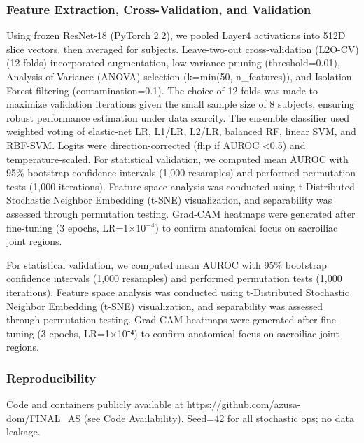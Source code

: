 \documentclass[12pt, a4paper]{article}
\begin{document}
\subsubsection{Feature Extraction, Cross-Validation, and Validation}
Using frozen ResNet-18 (PyTorch 2.2), we pooled Layer4 activations into 512D slice vectors, then averaged for subjects. Leave-two-out cross-validation (L2O-CV) (12 folds) incorporated augmentation, low-variance pruning (threshold=0.01), Analysis of Variance (ANOVA) selection (k=min(50, n\_features)), and Isolation Forest filtering (contamination=0.1). The choice of 12 folds was made to maximize validation iterations given the small sample size of 8 subjects, ensuring robust performance estimation under data scarcity. The ensemble classifier used weighted voting of elastic-net LR, L1/LR, L2/LR, balanced RF, linear SVM, and RBF-SVM. Logits were direction-corrected (flip if AUROC <0.5) and temperature-scaled. For statistical validation, we computed mean AUROC with 95\% bootstrap confidence intervals (1,000 resamples) and performed permutation tests (1,000 iterations). Feature space analysis was conducted using t-Distributed Stochastic Neighbor Embedding (t-SNE) visualization, and separability was assessed through permutation testing. Grad-CAM heatmaps were generated after fine-tuning (3 epochs, LR=1×10$^{-4}$) to confirm anatomical focus on sacroiliac joint regions.


For statistical validation, we computed mean AUROC with 95\% bootstrap confidence intervals (1,000 resamples) and performed permutation tests (1,000 iterations). Feature space analysis was conducted using t-Distributed Stochastic Neighbor Embedding (t-SNE) visualization, and separability was assessed through permutation testing. Grad-CAM heatmaps were generated after fine-tuning (3 epochs, LR=1×10⁻⁴) to confirm anatomical focus on sacroiliac joint regions.

\subsubsection{Reproducibility}
Code and containers publicly available at \url{https://github.com/azusa-dom/FINAL_AS} (see Code Availability). Seed=42 for all stochastic ops; no data leakage.
\end{document}
